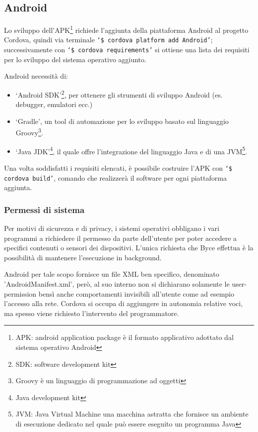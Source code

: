 \documentclass[target=bach]{thud}
\begin{document}
    \subsection{Android}

        Lo sviluppo dell'APK\footnote[1]{APK: android application package è il formato applicativo adottato dal sistema operativo Android} richiede l'aggiunta della piattaforma Android al progetto Cordova, quindi via terminale \texttt{`\$ cordova platform add Android'}; successivamente con \texttt{`\$ cordova requirements'} si ottiene una lista dei requisiti per lo sviluppo del sistema operativo aggiunto.

        Android necessità di:
        \begin{itemize}
            \setlength{\itemsep}{1pt}
            \item `Android SDK'\footnote[2]{SDK: software development kit}, per ottenere gli strumenti di sviluppo Android (es. debugger, emulatori ecc.)
            \item `Gradle', un tool di automazione per lo sviluppo basato sul linguaggio Groovy\footnote[3]{Groovy è un linguaggio di programmazione ad oggetti}.
            \item `Java JDK'\footnote[4]{Java development kit}, il quale offre l'integrazione del linguaggio Java e di una JVM\footnote[5]{JVM: Java Virtual Machine una macchina astratta che fornisce un ambiente di esecuzione dedicato nel quale può essere eseguito un programma Java}.
        \end{itemize}

        Una volta soddisfatti i requisiti elencati, è possibile costruire l'APK con \texttt{`\$ cordova build'}, comando che realizzerà il software per ogni piattaforma aggiunta.

            \subsubsection{Permessi di sistema}

            Per motivi di sicurezza e di privacy, i sistemi operativi obbligano i vari programmi a richiedere il permesso da parte dell'utente per poter accedere a specifici contenuti o sensori dei dispositivi.
            L'unica richiesta che Byce effettua è la possibilità di mantenere l'esecuzione in background.

            Android per tale scopo fornisce un file XML ben specifico, denominato 'AndroidManifest.xml', però, al suo interno non si dichiarano solamente le user-permission bensì anche comportamenti invisibili all'utente come ad esempio l'accesso alla rete.
            Cordova si occupa di aggiungere in autonomia relative voci, ma spesso viene richiesto l'intervento del programmatore.
\end{document}
